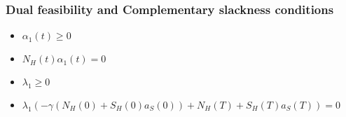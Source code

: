 \documentclass{article}
\begin{document}
\subsubsection{Dual feasibility and Complementary slackness conditions}
\begin{itemize}
    \item $\alpha_{1}{\left(t \right)} \geq 0$
    \item $N_{H}{\left(t \right)} \alpha_{1}{\left(t \right)} = 0$
    \item $\lambda_{1} \geq 0$
    \item $\lambda_{1} \left(- \gamma \left(N_{H}{\left(0 \right)} + S_{H}{\left(0 \right)} a_{S}{\left(0 \right)}\right) + N_{H}{\left(T \right)} + S_{H}{\left(T \right)} a_{S}{\left(T \right)}\right) = 0$
\end{itemize}
\end{document}
